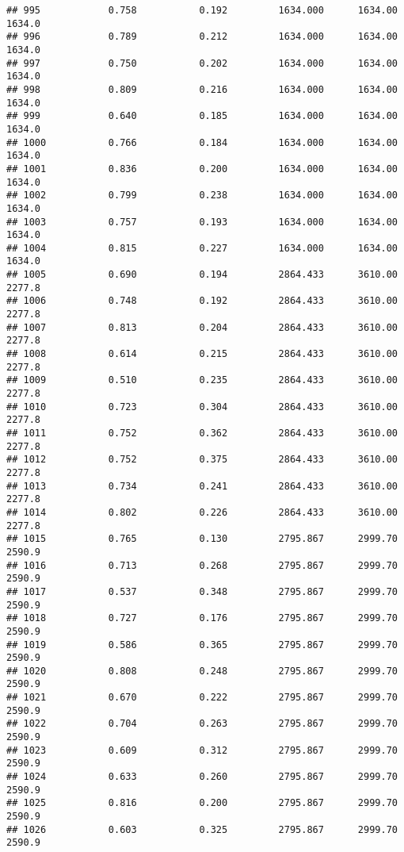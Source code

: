 \documentclass[
]{article}
\begin{document}
\begin{verbatim}
## 995            0.758           0.192         1634.000      1634.00       1634.0
## 996            0.789           0.212         1634.000      1634.00       1634.0
## 997            0.750           0.202         1634.000      1634.00       1634.0
## 998            0.809           0.216         1634.000      1634.00       1634.0
## 999            0.640           0.185         1634.000      1634.00       1634.0
## 1000           0.766           0.184         1634.000      1634.00       1634.0
## 1001           0.836           0.200         1634.000      1634.00       1634.0
## 1002           0.799           0.238         1634.000      1634.00       1634.0
## 1003           0.757           0.193         1634.000      1634.00       1634.0
## 1004           0.815           0.227         1634.000      1634.00       1634.0
## 1005           0.690           0.194         2864.433      3610.00       2277.8
## 1006           0.748           0.192         2864.433      3610.00       2277.8
## 1007           0.813           0.204         2864.433      3610.00       2277.8
## 1008           0.614           0.215         2864.433      3610.00       2277.8
## 1009           0.510           0.235         2864.433      3610.00       2277.8
## 1010           0.723           0.304         2864.433      3610.00       2277.8
## 1011           0.752           0.362         2864.433      3610.00       2277.8
## 1012           0.752           0.375         2864.433      3610.00       2277.8
## 1013           0.734           0.241         2864.433      3610.00       2277.8
## 1014           0.802           0.226         2864.433      3610.00       2277.8
## 1015           0.765           0.130         2795.867      2999.70       2590.9
## 1016           0.713           0.268         2795.867      2999.70       2590.9
## 1017           0.537           0.348         2795.867      2999.70       2590.9
## 1018           0.727           0.176         2795.867      2999.70       2590.9
## 1019           0.586           0.365         2795.867      2999.70       2590.9
## 1020           0.808           0.248         2795.867      2999.70       2590.9
## 1021           0.670           0.222         2795.867      2999.70       2590.9
## 1022           0.704           0.263         2795.867      2999.70       2590.9
## 1023           0.609           0.312         2795.867      2999.70       2590.9
## 1024           0.633           0.260         2795.867      2999.70       2590.9
## 1025           0.816           0.200         2795.867      2999.70       2590.9
## 1026           0.603           0.325         2795.867      2999.70       2590.9

\end{verbatim}
\end{document}
